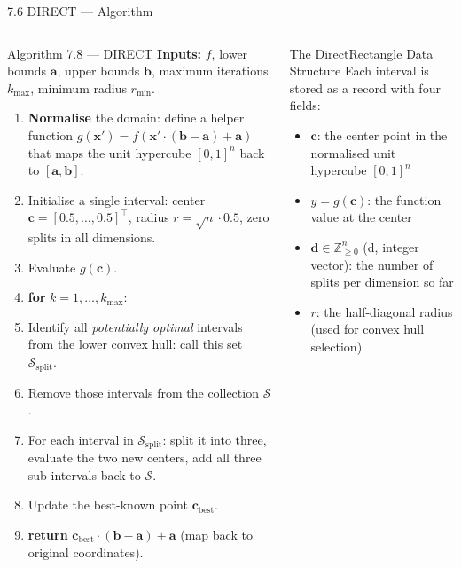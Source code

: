 \documentclass[aspectratio=169,10pt]{beamer}
\begin{document}
\begin{frame}[allowframebreaks]{7.6 DIRECT --- Algorithm}
  \begin{columns}[T]
      \begin{alertblock}{Algorithm 7.8 --- DIRECT}
        \textbf{Inputs:} $f$, lower bounds $\mathbf{a}$, upper bounds
        $\mathbf{b}$, maximum iterations $k_{\max}$, minimum radius
        $r_{\min}$.

        \begin{enumerate}\setlength\itemsep{1pt}
          \item \textbf{Normalise} the domain: define a helper function
                $g(\mathbf{x}') = f(\mathbf{x}' \cdot (\mathbf{b}-\mathbf{a}) + \mathbf{a})$
                that maps the unit hypercube $[0,1]^n$ back to
                $[\mathbf{a},\mathbf{b}]$.
          \item Initialise a single interval: center
                $\mathbf{c} = [0.5,\ldots,0.5]^\top$,
                radius $r = \sqrt{n}\cdot 0.5$,
                zero splits in all dimensions.
          \item Evaluate $g(\mathbf{c})$.
          \item \textbf{for} $k = 1,\ldots,k_{\max}$:
          \item \quad Identify all \emph{potentially optimal} intervals
                from the lower convex hull: call this set
                $\mathcal{S}_{\text{split}}$.
          \item \quad Remove those intervals from the collection $\mathcal{S}$.
          \item \quad For each interval in $\mathcal{S}_{\text{split}}$:
                split it into three, evaluate the two new centers,
                add all three sub-intervals back to $\mathcal{S}$.
          \item \quad Update the best-known point $\mathbf{c}_{\text{best}}$.
          \item \textbf{return} $\mathbf{c}_{\text{best}} \cdot
                (\mathbf{b}-\mathbf{a}) + \mathbf{a}$
                (map back to original coordinates).
        \end{enumerate}
      \end{alertblock}
      \begin{block}{The DirectRectangle Data Structure}
        Each interval is stored as a record with four fields:
        \begin{itemize}\setlength\itemsep{2pt}
          \item $\mathbf{c}$: the center point in the normalised unit
                hypercube $[0,1]^n$
          \item $y = g(\mathbf{c})$: the function value at the center
          \item $\mathbf{d} \in \mathbb{Z}^n_{\ge 0}$ (d, integer vector):
                the number of splits per dimension so far
          \item $r$: the half-diagonal radius (used for convex hull
                selection)
        \end{itemize}
      \end{block}


\end{columns}
\end{frame}
\end{document}
